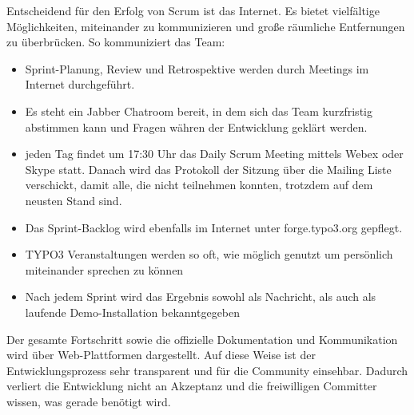 Entscheidend für den Erfolg von Scrum ist das Internet. Es bietet vielfältige Möglichkeiten,
miteinander zu kommunizieren und große räumliche Entfernungen zu überbrücken. So kommuniziert das
Team:
\begin{itemize}
\item Sprint-Planung, Review und Retrospektive werden durch Meetings im Internet durchgeführt.
\item Es steht ein Jabber Chatroom bereit, in dem sich das Team kurzfristig abstimmen kann und
Fragen währen der Entwicklung geklärt werden.
\item jeden Tag findet um 17:30 Uhr das Daily Scrum Meeting mittels Webex oder Skype statt. Danach
wird das Protokoll der Sitzung über die Mailing Liste verschickt, damit alle, die nicht teilnehmen
konnten, trotzdem auf dem neusten Stand sind.
\item Das Sprint-Backlog wird ebenfalls im Internet unter forge.typo3.org gepflegt.
\item TYPO3 Veranstaltungen werden so oft, wie möglich genutzt um persönlich miteinander sprechen zu
können
\item Nach jedem Sprint wird das Ergebnis sowohl als Nachricht, als auch als laufende
Demo-Installation bekanntgegeben
\end{itemize}

Der gesamte Fortschritt sowie die offizielle Dokumentation und Kommunikation wird über
Web-Plattformen dargestellt. Auf diese Weise ist der Entwicklungsprozess sehr transparent und für
die Community einsehbar. Dadurch verliert die Entwicklung nicht an Akzeptanz und die freiwilligen
Committer wissen, was gerade benötigt wird.

